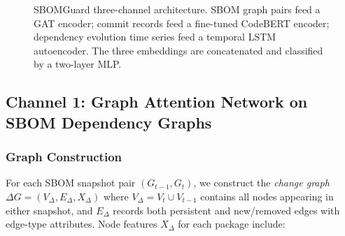 \documentclass[sigconf,nonacm]{acmart}
\begin{document}
\begin{figure}[t]
\caption{SBOMGuard three-channel architecture. SBOM graph pairs feed a GAT encoder;
  commit records feed a fine-tuned CodeBERT encoder; dependency evolution time
  series feed a temporal LSTM autoencoder. The three embeddings are concatenated
  and classified by a two-layer MLP.}
\label{fig:arch}
\end{figure}

\subsection{Channel 1: Graph Attention Network on SBOM Dependency Graphs}

\subsubsection{Graph Construction}

For each SBOM snapshot pair $(G_{t-1}, G_t)$, we construct the \emph{change graph}
$\Delta G = (V_\Delta, E_\Delta, X_\Delta)$ where $V_\Delta = V_t \cup V_{t-1}$
contains all nodes appearing in either snapshot, and $E_\Delta$ records both
persistent and new/removed edges with edge-type attributes. Node features $X_\Delta$
for each package include:
\end{document}
